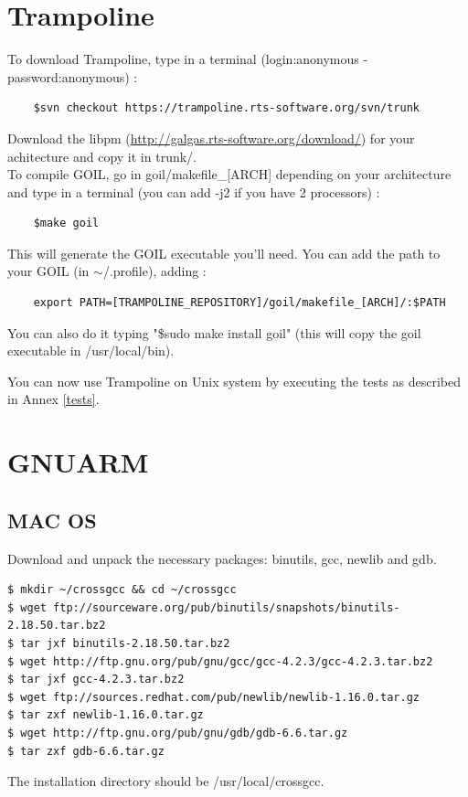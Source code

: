 \section{Trampoline}
To download Trampoline, type in a terminal (login:anonymous - password:anonymous) :
	\begin{verbatim}
	$svn checkout https://trampoline.rts-software.org/svn/trunk
	\end{verbatim}
Download the libpm (\href{http://galgas.rts-software.org/download/}{http://galgas.rts-software.org/download/}) for your achitecture and copy it in trunk/.\\
To compile GOIL, go in goil/makefile\_[ARCH] depending on your architecture and type in a terminal (you can add -j2 if you have 2 processors) :
	\begin{verbatim}
	$make goil
	\end{verbatim}
This will generate the GOIL executable you'll need. You can add the path to your GOIL (in $\sim$/.profile), adding :
	\begin{verbatim}
	export PATH=[TRAMPOLINE_REPOSITORY]/goil/makefile_[ARCH]/:$PATH
	\end{verbatim}

You can also do it typing "\$sudo make install goil" (this will copy the goil executable in /usr/local/bin).

You can now use Trampoline on Unix system by executing the tests as described in Annex \ref{tests}.

\section{GNUARM}
\subsection{MAC OS}
Download and unpack the necessary packages: binutils, gcc, newlib and gdb.
\begin{verbatim}
$ mkdir ~/crossgcc && cd ~/crossgcc
$ wget ftp://sourceware.org/pub/binutils/snapshots/binutils-2.18.50.tar.bz2
$ tar jxf binutils-2.18.50.tar.bz2
$ wget http://ftp.gnu.org/pub/gnu/gcc/gcc-4.2.3/gcc-4.2.3.tar.bz2
$ tar jxf gcc-4.2.3.tar.bz2
$ wget ftp://sources.redhat.com/pub/newlib/newlib-1.16.0.tar.gz
$ tar zxf newlib-1.16.0.tar.gz
$ wget http://ftp.gnu.org/pub/gnu/gdb/gdb-6.6.tar.gz
$ tar zxf gdb-6.6.tar.gz
\end{verbatim}

The installation directory should be /usr/local/crossgcc.

